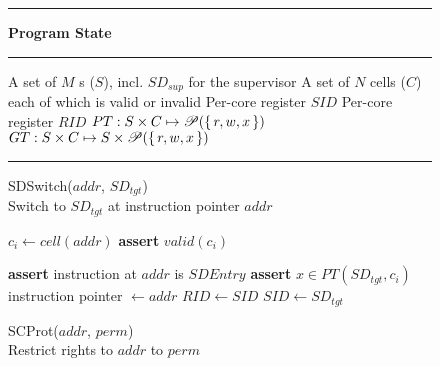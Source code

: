 \begin{figure*}[!t]

  \rule{\textwidth}{1pt}
  \centering
  \textbf{\seccells Program State\\}
  \rule{\textwidth}{1pt}
  \vspace{-2\baselineskip}
  \begin{multicols}{2}
    \begin{algorithmic}[1]
      \State A set of $M$ \secdiv{}s ($S$), incl. $SD_{sup}$ for the supervisor
      \State A set of $N$ cells ($C$) each of which is valid or invalid
      \State Per-core register $SID$
      \State Per-core register $RID$
      \State \ptable $PT: S \times C \mapsto \mathscr{P}(\set{r, w, x})$
      \State \gtable $GT: S \times C \mapsto S \times \mathscr{P}(\set{r, w, x})$
    \end{algorithmic}
  \end{multicols}
  \vspace{-1.3\baselineskip}
  \rule{\textwidth}{1pt}

\begin{multicols}{2}
\removelatexerror


    \begin{algorithm}[H]
      \caption{SDSwitch($addr$, $SD_{tgt}$) \\
        Switch to $SD_{tgt}$ at instruction pointer $addr$   }
        \begin{algorithmic}[1]

          \State $c_i \gets cell(addr)$
          \State \textbf{assert} $valid(c_i)$

          \State \textbf{assert} instruction at $addr$ is $SDEntry$
          \State \textbf{assert} $x \in PT(SD_{tgt}, c_i)$
          \State instruction pointer $\gets addr$
          \State $RID \gets SID$
          \State $SID \gets SD_{tgt}$
        \end{algorithmic}
        \label{alg:sdswitch}
    \end{algorithm}
    \vspace{-0.5\baselineskip}

    \begin{algorithm}[H]
      \caption{SCProt($addr$, $perm$) \\
      Restrict rights to $addr$ to $perm$              }
      \begin{algorithmic}[1]


\end{algorithmic}
\end{algorithm}
\end{multicols}
\end{figure*}
